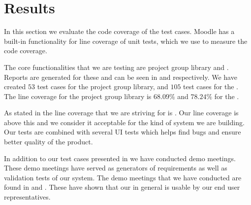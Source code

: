 \section{Results}
\label{sec:results}
In this section we evaluate the code coverage of the test cases. 
Moodle has a built-in functionality for line coverage of unit tests, which we use to measure the code coverage.

The core functionalities that we are testing are project group library and \admlib{}.
Reports are generated for these and can be seen in  and  respectively.
We have created $53$ test cases for the project group library, and $105$ test cases for the \admlib{}.
The line coverage for the project group library is $68.09\%$ and $78.24\%$ for the \admlib{}.

As stated in  the line coverage that we are striving for is \idealCC{}.
Our line coverage is above this and we consider it acceptable for the kind of system we are building. 
Our tests are combined with several UI tests which helps find bugs and ensure better quality of the product.

In addition to our test cases presented in  we have conducted demo meetings.
These demo meetings have served as generators of requirements as well as validation tests of our system.
The demo meetings that we have conducted are found in  and .
These have shown that our \subsystem{} in general is usable by our end user representatives.